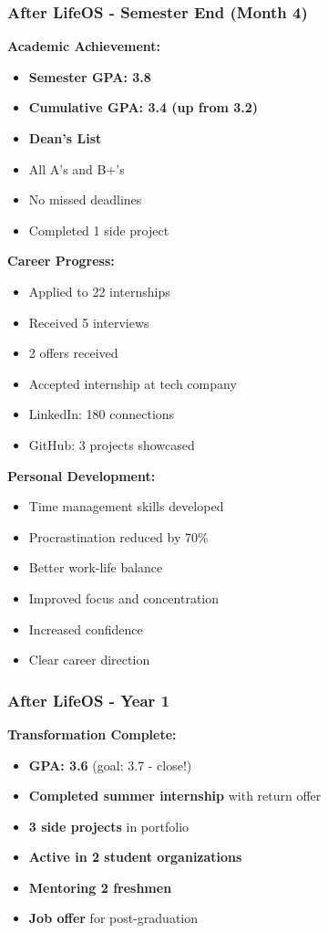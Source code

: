 \subsubsection{After LifeOS - Semester End (Month 4)}

\textbf{Academic Achievement:}
\begin{itemize}
    \item \textbf{Semester GPA: 3.8}
    \item \textbf{Cumulative GPA: 3.4 (up from 3.2)}
    \item \textbf{Dean's List}
    \item All A's and B+'s
    \item No missed deadlines
    \item Completed 1 side project
\end{itemize}

\textbf{Career Progress:}
\begin{itemize}
    \item Applied to 22 internships
    \item Received 5 interviews
    \item 2 offers received
    \item Accepted internship at tech company
    \item LinkedIn: 180 connections
    \item GitHub: 3 projects showcased
\end{itemize}

\textbf{Personal Development:}
\begin{itemize}
    \item Time management skills developed
    \item Procrastination reduced by 70\%
    \item Better work-life balance
    \item Improved focus and concentration
    \item Increased confidence
    \item Clear career direction
\end{itemize}

\subsubsection{After LifeOS - Year 1}

\textbf{Transformation Complete:}
\begin{itemize}
    \item \textbf{GPA: 3.6} (goal: 3.7 - close!)
    \item \textbf{Completed summer internship} with return offer
    \item \textbf{3 side projects} in portfolio
    \item \textbf{Active in 2 student organizations}
    \item \textbf{Mentoring 2 freshmen}
    \item \textbf{Job offer} for post-graduation
\end{itemize}

